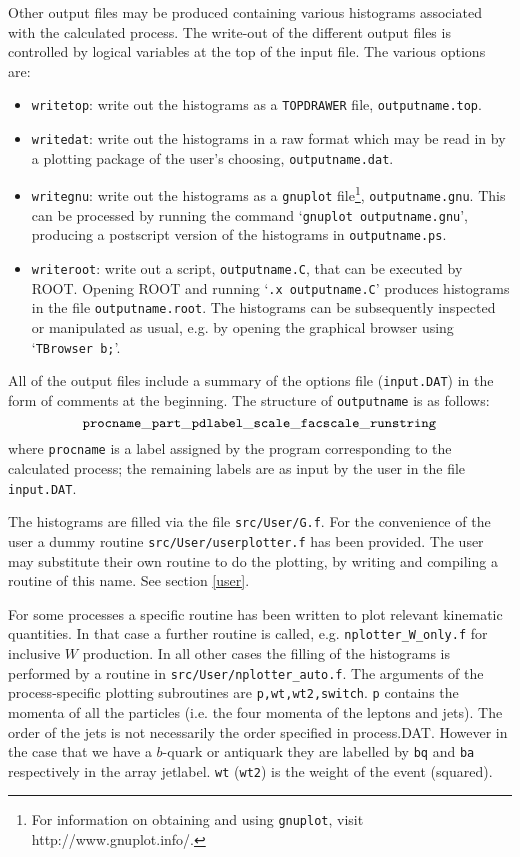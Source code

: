 \documentclass[12pt]{article}
\begin{document}
Other output files may be produced containing various histograms associated
with the calculated process. The write-out of the different output files
is controlled by logical variables at the top of the input file. The various options are:
\begin{itemize}
\item {\tt writetop}:  write out the histograms as a {\tt TOPDRAWER} file,
{\tt outputname.top}.
\item {\tt writedat}:  write out the histograms in a raw format 
which may be read in by a plotting package of the user's choosing,
{\tt outputname.dat}.
\item {\tt writegnu}:  write out the histograms as a {\tt gnuplot} file\footnote{
For information on obtaining and using {\tt gnuplot}, visit http://www.gnuplot.info/.},
{\tt outputname.gnu}.  This can be processed by running the command
`{\tt gnuplot outputname.gnu}', producing a postscript version of the histograms
in  {\tt outputname.ps}.
\item {\tt writeroot}:  write out a script, {\tt outputname.C}, that
can be executed by ROOT. Opening ROOT and running `{\tt .x outputname.C}'
produces histograms in the file
{\tt outputname.root}. The histograms can be subsequently inspected or manipulated
as usual, e.g. by opening the graphical browser using `{\tt TBrowser b;}'.
\end{itemize}

All of the output files include a summary of the options file ({\tt input.DAT}) in the form of
comments at the beginning. The structure
of {\tt outputname} is as follows:
\begin{displaymath}
{\tt procname\_part\_pdlabel\_scale\_facscale\_runstring}
\end{displaymath}
where {\tt procname} is a label assigned by the program corresponding to
the calculated process; the remaining labels are as input by the user
in the file {\tt input.DAT}.

The histograms are filled via the file {\tt src/User/G.f}. 
For the convenience of the user a dummy routine {\tt src/User/userplotter.f}
has been provided. The user may substitute their own routine to do the plotting,
by writing and compiling a routine of this name. See section \ref{user}.
 
For some processes
a specific routine has been written to plot relevant kinematic quantities. In that case
a further routine is called, e.g. {\tt nplotter\_W\_only.f} for inclusive $W$ production.
In all other cases the filling of the histograms is performed by a routine in
{\tt src/User/nplotter\_auto.f}. The arguments of the process-specific plotting subroutines
are { \tt p,wt,wt2,switch}. {\tt p} contains the momenta of all the particles
(i.e. the four momenta of the leptons and jets). The order of the jets is not
necessarily the  order specified in process.DAT.  However in the case that we have a 
$b$-quark or antiquark they are labelled by {\tt bq} and {\tt ba} respectively
in the array jetlabel. {\tt wt} ({\tt wt2}) is the weight of the event (squared).  
\end{document}

